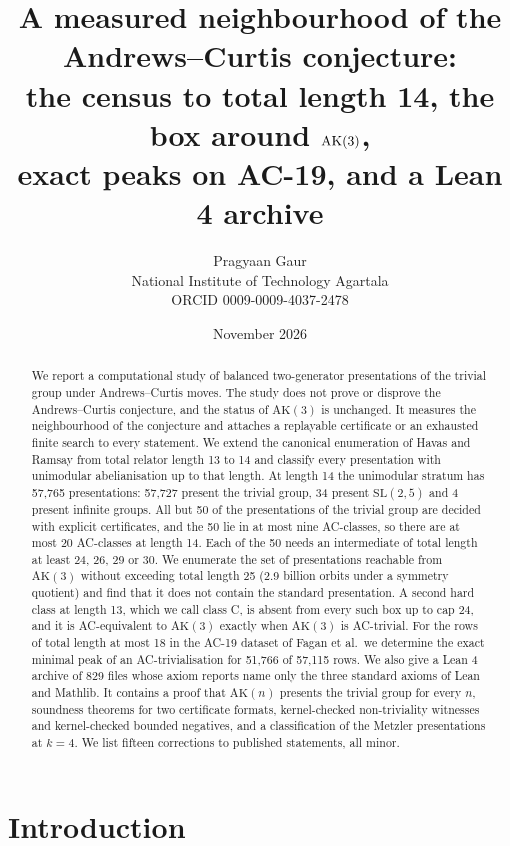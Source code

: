 \documentclass[11pt,a4paper]{article}
\title{A measured neighbourhood of the Andrews--Curtis conjecture:\\ the census to total length 14, the box around $\AK(3)$,\\ exact peaks on AC-19, and a Lean 4 archive}
\author{Pragyaan Gaur\\ \small National Institute of Technology Agartala\\ \small ORCID 0009-0009-4037-2478}
\date{November 2026}
\theoremstyle{definition}
\newcommand{\AK}{\mathrm{AK}}
\begin{document}
\maketitle

\begin{abstract}
We report a computational study of balanced two-generator presentations of the trivial group under Andrews--Curtis moves. The study does not prove or disprove the Andrews--Curtis conjecture, and the status of $\AK(3)$ is unchanged. It measures the neighbourhood of the conjecture and attaches a replayable certificate or an exhausted finite search to every statement. We extend the canonical enumeration of Havas and Ramsay from total relator length 13 to 14 and classify every presentation with unimodular abelianisation up to that length. At length 14 the unimodular stratum has 57,765 presentations: 57,727 present the trivial group, 34 present $\mathrm{SL}(2,5)$ and 4 present infinite groups. All but 50 of the presentations of the trivial group are decided with explicit certificates, and the 50 lie in at most nine AC-classes, so there are at most 20 AC-classes at length 14. Each of the 50 needs an intermediate of total length at least 24, 26, 29 or 30. We enumerate the set of presentations reachable from $\AK(3)$ without exceeding total length 25 (2.9 billion orbits under a symmetry quotient) and find that it does not contain the standard presentation. A second hard class at length 13, which we call class C, is absent from every such box up to cap 24, and it is AC-equivalent to $\AK(3)$ exactly when $\AK(3)$ is AC-trivial. For the rows of total length at most 18 in the AC-19 dataset of Fagan et al.\ we determine the exact minimal peak of an AC-trivialisation for 51,766 of 57,115 rows. We also give a Lean 4 archive of 829 files whose axiom reports name only the three standard axioms of Lean and Mathlib. It contains a proof that $\AK(n)$ presents the trivial group for every $n$, soundness theorems for two certificate formats, kernel-checked non-triviality witnesses and kernel-checked bounded negatives, and a classification of the Metzler presentations at $k=4$. We list fifteen corrections to published statements, all minor.
\end{abstract}

\tableofcontents
\newpage

\section{Introduction}
\end{document}
